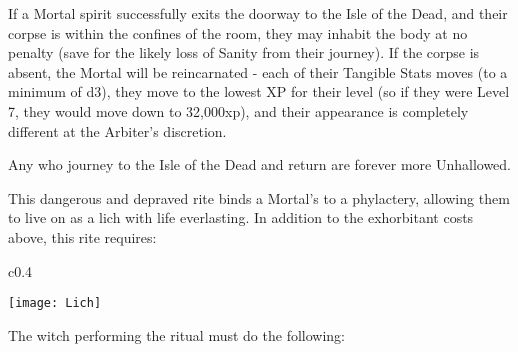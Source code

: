 {If a Mortal spirit successfully exits the doorway to the Isle of the Dead, and their corpse is within the confines of the room, they may inhabit the body at no penalty (save for the likely loss of Sanity from their journey).  If the corpse is absent, the Mortal will be reincarnated - each of their Tangible Stats moves \DCDOWN (to a minimum of d3), they move to the lowest XP for their level (so if they were Level 7, they would move down to 32,000xp), and their appearance is completely different at the Arbiter's discretion.

Any who journey to the Isle of the Dead and return are forever more Unhallowed. 

\newpage

\OCCULT[
  Name=Lichdom,
  Link=occultism-lichdom,
  Success=2 (plus see below),
  Cost=66{,}666\AU
]

This dangerous and depraved rite binds a Mortal's  to a phylactery, allowing them to live on as a lich with life everlasting. In addition to the exhorbitant costs above, this rite requires:

\begin{wrapfigure}{c}{0.4\textwidth}
  \begin{center}
    \texttt{[image: Lich]}
  \end{center}
\end{wrapfigure}






The witch performing the ritual must do the following:

}
